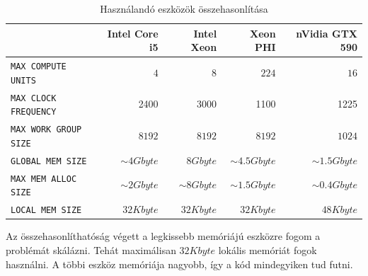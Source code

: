 	\begin{table}[!h]
	\setlength{\extrarowheight}{8pt}
	\caption{Használandó eszközök összehasonlítása}
	\label{table:envs}
	\centering
	\footnotesize
	\begin{tabular}{ l | r | r | r | r}
		 & Intel Core i5 & Intel Xeon & Xeon PHI & nVidia GTX 590\\ \hline
		\texttt{MAX COMPUTE UNITS} & $4$ & $8$ & $224$ & $16$\\
		\texttt{MAX CLOCK FREQUENCY} & 2400 & 3000 & 1100 & 1225\\
		\texttt{MAX WORK GROUP SIZE} & $8192$ & $8192$ & $8192$ & $1024$\\ \hline\hline
		\texttt{GLOBAL MEM SIZE} & $\sim 4Gbyte$ & $8Gbyte$ & $\sim 4.5Gbyte$ & $\sim 1.5Gbyte$\\
		\texttt{MAX MEM ALLOC SIZE} & $\sim 2Gbyte$ & $\sim 8Gbyte$ & $\sim 1.5Gbyte$ & $\sim 0.4Gbyte$\\
		\texttt{LOCAL MEM SIZE} & $32 Kbyte$ & $32 Kbyte$ & $32 Kbyte$ & $48 Kbyte$\\
	\end{tabular}
	
	\end{table}
	
	Az összehasonlíthatóság végett a legkissebb memóriájú eszközre fogom a problémát skálázni. Tehát maximálisan $32 Kbyte$ lokális
	memóriát fogok használni. A többi eszköz memóriája nagyobb, így a kód mindegyiken tud futni.
	